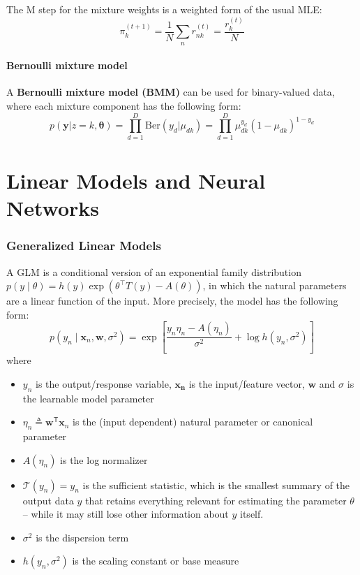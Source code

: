 \documentclass[11pt]{article}
\begin{document}
The M step for the mixture weights is a weighted form of the usual MLE:
\[
\pi_k^{(t+1)} = \frac{1}{N} \sum_n r_{nk}^{(t)} = \frac{r_k^{(t)}}{N}
\]

\subsection{Bernoulli mixture model}
A \textbf{Bernoulli mixture model (BMM)} can be used for binary-valued data, where each mixture component has the following form:
\[
p(\boldsymbol{y}|z=k, \boldsymbol{\theta}) = \prod_{d=1}^{D} \text{Ber}(y_d | \mu_{dk}) = \prod_{d=1}^{D} \mu_{dk}^{y_d} (1 - \mu_{dk})^{1-y_d}
\]

\clearpage
\part{Linear Models and Neural Networks}
\section{Generalized Linear Models}

A GLM is a conditional version of an exponential family distribution $p(y \mid \theta) = h(y) \exp\left(\theta^\top T(y) - A(\theta)\right)$, in which the natural parameters are a linear function of the input. More precisely, the model has the following form:
\[
p(y_n \mid \boldsymbol{x}_n, \boldsymbol{w}, \sigma^2)
= \exp\left[\frac{y_n\eta_n - A(\eta_n)}{\sigma^2} + \log h(y_n, \sigma^2)\right]
\]
where 
\begin{itemize}
    \item $y_n$ is the output/response variable, $\boldsymbol{x_n}$ is the input/feature vector, $\boldsymbol{w}$ and $\sigma$ is the learnable model parameter 
    \item $\eta_n \triangleq \boldsymbol{w}^{\mathsf{T}}\boldsymbol{x}_n$ is the (input dependent) natural parameter or canonical parameter
    \item $A(\eta_n)$ is the log normalizer
    \item $\mathcal{T}(y_n) = y_n$ is the sufficient statistic, which is the smallest summary of the output data $y$ that retains everything relevant for estimating the parameter $\theta$ -- while it may still lose other information about $y$ itself.
    \item $\sigma^2$ is the dispersion term
    \item $h(y_n, \sigma^2)$  is the scaling constant or base measure
\end{itemize}
\end{document}
